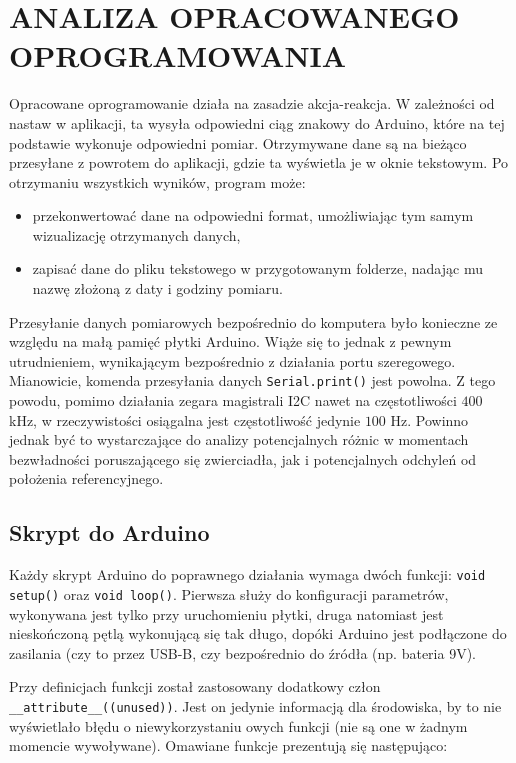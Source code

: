 \chapter{ANALIZA OPRACOWANEGO OPROGRAMOWANIA}

Opracowane oprogramowanie działa na zasadzie akcja-reakcja. W zależności od nastaw w aplikacji, ta wysyła odpowiedni ciąg znakowy do Arduino, które na tej podstawie wykonuje odpowiedni pomiar. Otrzymywane dane są na bieżąco przesyłane z powrotem do aplikacji, gdzie ta wyświetla je w oknie tekstowym. Po otrzymaniu wszystkich wyników, program może:

\begin{itemize}
    \item przekonwertować dane na odpowiedni format, umożliwiając tym samym wizualizację otrzymanych danych,
    \item zapisać dane do pliku tekstowego w przygotowanym folderze, nadając mu nazwę złożoną z daty i godziny pomiaru.
\end{itemize}

Przesyłanie danych pomiarowych bezpośrednio do komputera było konieczne ze względu na małą pamięć płytki Arduino. Wiąże się to jednak z pewnym utrudnieniem, wynikającym bezpośrednio z działania portu szeregowego. Mianowicie, komenda przesyłania danych \lstinline{Serial.print()} jest powolna. Z tego powodu, pomimo działania zegara magistrali I2C nawet na częstotliwości $400$ kHz, w rzeczywistości osiągalna jest częstotliwość jedynie $100$ Hz. Powinno jednak być to wystarczające do analizy potencjalnych różnic w momentach bezwładności poruszającego się zwierciadła, jak i potencjalnych odchyleń od położenia referencyjnego.

\section{Skrypt do Arduino}

Każdy skrypt Arduino do poprawnego działania wymaga dwóch funkcji: \lstinline{void setup()} oraz \lstinline{void loop()}. Pierwsza służy do konfiguracji parametrów, wykonywana jest tylko przy uruchomieniu płytki, druga natomiast jest nieskończoną pętlą wykonującą się tak długo, dopóki Arduino jest podłączone do zasilania (czy to przez USB-B, czy bezpośrednio do źródła (np. bateria 9V).

Przy definicjach funkcji został zastosowany dodatkowy człon \lstinline{__attribute__((unused))}. Jest on jedynie informacją dla środowiska, by to nie wyświetlało błędu o niewykorzystaniu owych funkcji (nie są one w żadnym momencie wywoływane). Omawiane funkcje prezentują się następująco:

